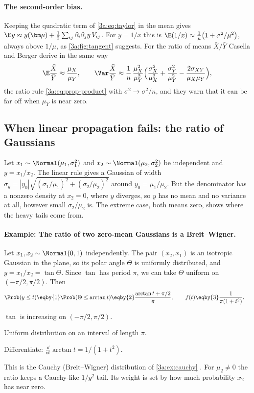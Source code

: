 \paragraph{The second-order bias.}
Keeping the quadratic term of \eqref{3a:eq:taylor} in the mean gives
$\E y\approx y(\bm\mu)+\frac12\sum_{ij}\partial_i\partial_jy\,V_{ij}$. For
$y=1/x$ this is $\E(1/x)\approx\frac1\mu\bigl(1+\sigma^2/\mu^2\bigr)$, always
above $1/\mu$, as \cref{3a:fig:tangent} suggests. For the ratio of means
$\bar X/\bar Y$ Casella and Berger derive in the same way
\[
  \E\frac{\bar X}{\bar Y}\approx\frac{\mu_X}{\mu_Y},\qquad
  \Var\frac{\bar X}{\bar Y}\approx\frac1n\,\frac{\mu_X^2}{\mu_Y^2}
  \Bigl(\frac{\sigma_X^2}{\mu_X^2}+\frac{\sigma_Y^2}{\mu_Y^2}-\frac{2\sigma_{XY}}{\mu_X\mu_Y}\Bigr),
\]
the ratio rule \eqref{3a:eq:prop-product} with $\sigma^2\to\sigma^2/n$, and
they warn that it can be far off when $\mu_Y$ is near zero.

\subsection{When linear propagation fails: the ratio of Gaussians}
\label{3a:sec:ratio}

Let $x_1\sim\Normal(\mu_1,\sigma_1^2)$ and $x_2\sim\Normal(\mu_2,\sigma_2^2)$ be
independent and $y=x_1/x_2$. The linear rule gives a Gaussian of width
$\sigma_y=|y_0|\sqrt{(\sigma_1/\mu_1)^2+(\sigma_2/\mu_2)^2}$ around
$y_0=\mu_1/\mu_2$. But the denominator has a nonzero density at $x_2=0$,
where $y$ diverges, so $y$ has no mean and no variance at all, however small
$\sigma_2/\mu_2$ is. The extreme case, both means zero, shows where the
heavy tails come from.

\paragraph{Example: The ratio of two zero-mean Gaussians is a Breit--Wigner.}
\label{3a:ex:ratio-cauchy}
Let $x_1,x_2\sim\Normal(0,1)$ independently. The pair $(x_2,x_1)$ is an
isotropic Gaussian in the plane, so its polar angle $\Theta$ is uniformly
distributed, and $y=x_1/x_2=\tan\Theta$. Since $\tan$ has period $\pi$, we can
take $\Theta$ uniform on $(-\pi/2,\pi/2)$. Then
\begin{align*}
  \Prob(y\le t)
  &\eqby{1} \Prob(\Theta\le\arctan t)
   \eqby{2} \frac{\arctan t+\pi/2}{\pi},\qquad
  f(t) \eqby{3} \frac{1}{\pi(1+t^2)} .
\end{align*}
\begin{explain}
  \item $\tan$ is increasing on $(-\pi/2,\pi/2)$.
  \item Uniform distribution on an interval of length $\pi$.
  \item Differentiate: $\frac{\dd}{\dd t}\arctan t=1/(1+t^2)$.
\end{explain}
This is the Cauchy (Breit--Wigner) distribution of \cref{3a:ex:cauchy}
. For $\mu_2\neq0$ the ratio keeps a
Cauchy-like $1/y^2$ tail. Its weight is set by how much probability $x_2$
has near zero.


